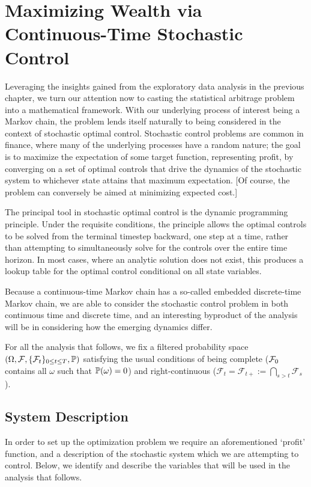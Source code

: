 \chapter{Maximizing Wealth via Continuous-Time Stochastic Control}
Leveraging the insights gained from the exploratory data analysis in the previous chapter, we turn our attention now to casting the statistical arbitrage problem into a mathematical framework. With our underlying process of interest being a Markov chain, the problem lends itself naturally to being considered in the context of stochastic optimal control. Stochastic control problems are common in finance, where many of the underlying processes have a random nature; the goal is to maximize the expectation of some target function, representing profit, by converging on a set of optimal controls that drive the dynamics of the stochastic system to whichever state attains that maximum expectation. [Of course, the problem can conversely be aimed at minimizing expected cost.]

The principal tool in stochastic optimal control is the dynamic programming principle. Under the requisite conditions, the principle allows the optimal controls to be solved from the terminal timestep backward, one step at a time, rather than attempting to simultaneously solve for the controls over the entire time horizon. In most cases, where an analytic solution does not exist, this produces a lookup table for the optimal control conditional on all state variables. 

Because a continuous-time Markov chain has a so-called embedded discrete-time Markov chain, we are able to consider the stochastic control problem in both continuous time and discrete time, and an interesting byproduct of the analysis will be in considering how the emerging dynamics differ.

For all the analysis that follows, we fix a filtered probability space $( \Omega, \cF, \{ \cF_t \}_{0 \leq t \leq T}, \P )$ satisfying the usual conditions of being complete ($\cF_0$ contains all $\omega$ such that $\P(\omega) = 0$) and right-continuous ($\mathcal{F}_t = \mathcal{F}_{t+} := \bigcap_{s > t} \mathcal{F}_s$).

\section{System Description}
In order to set up the optimization problem we require an aforementioned `profit' function, and a description of the stochastic system which we are attempting to control. Below, we identify and describe the variables that will be used in the analysis that follows.

